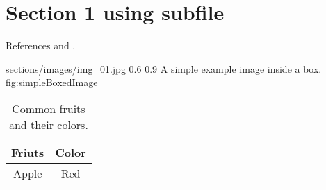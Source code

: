 \documentclass[../../../main.tex]{subfiles}
\begin{document}
\section{Section 1 using subfile}
References \parencite{Ref01}  and \parencite{Ref02}.

\begin{centerBoxImageStyle}
    {sections/images/img_01.jpg}     
    {0.6\linewidth}                         
    {0.9\linewidth}                         
    {A simple example image inside a box.}  
    {fig:simpleBoxedImage}               
\end{centerBoxImageStyle}


\begin{table}[h!] %
    \centering
    \begin{tabular}{|c|c|}     \hline
        Friuts & Color          \\ \hline
        Apple & Red             \\ \hline
    \end{tabular}
    \caption{Common fruits and their colors.}
\end{table}
\end{document}
